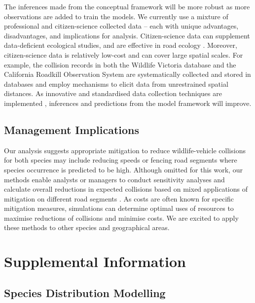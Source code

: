 The inferences made from the conceptual framework will be more robust as more observations are added to train the models.  We currently use a mixture of professional and citizen-science collected data -- each with unique advantages, disadvantages, and implications for analysis.  Citizen-science data can supplement data-deficient ecological studies, and are effective in road ecology \citep{dwye16,paul14}.  Moreover, citizen-science data is relatively low-cost and can cover large spatial scales.  For example, the collision records in both the Wildlife Victoria database and the California Roadkill Observation System are systematically collected and stored in databases and employ mechanisms to elicit data from unrestrained spatial distances.  As innovative and standardised data collection techniques are implemented \citep[see][]{aane09,dona10,shil15b}, inferences and predictions from the model framework will improve.

\subsection{Management Implications}

Our analysis suggests appropriate mitigation to reduce wildlife-vehicle collisions for both species may include reducing speeds or fencing road segments where species occurrence is predicted to be high.  Although omitted for this work, our methods enable analysts or managers to conduct sensitivity analyses and calculate overall reductions in expected collisions based on mixed applications of mitigation on different road segments \citep[assuming the mitigation is 100\% effective, but see][]{huij09}.  As costs are often known for specific mitigation measures, simulations can determine optimal uses of resources to maximise reductions of collisions and minimise costs. We are excited to apply these methods to other species and geographical areas.

\section{Supplemental Information}\label{isec:occ}

\subsection{Species Distribution Modelling}

